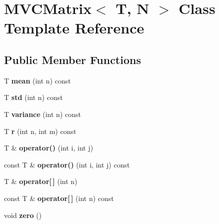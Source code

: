\hypertarget{classMVCMatrix}{}\section{M\+V\+C\+Matrix$<$ T, N $>$ Class Template Reference}
\label{classMVCMatrix}
\subsection*{Public Member Functions}
\begin{DoxyCompactItemize}
\item 
\mbox{\label{classMVCMatrix_a08f50c0e3b5565a94599fe1e9bfb473a}} 
T {\bfseries mean} (int n) const
\item 
\mbox{\label{classMVCMatrix_a57beba1da7fe709bbb9d0e8fd15759bf}} 
T {\bfseries std} (int n) const
\item 
\mbox{\label{classMVCMatrix_a16edd049740bd6aabcc380f17c48204a}} 
T {\bfseries variance} (int n) const
\item 
\mbox{\label{classMVCMatrix_a28dfce1aa8d04008ca50605332c2f2b0}} 
T {\bfseries r} (int n, int m) const
\item 
\mbox{\label{classMVCMatrix_a029ee737822faabdf046f956ca0776bd}} 
T \& {\bfseries operator()} (int i, int j)
\item 
\mbox{\label{classMVCMatrix_a57937186999075e8201e645a15302d05}} 
const T \& {\bfseries operator()} (int i, int j) const
\item 
\mbox{\label{classMVCMatrix_a609c0b7ba6a1e68cefece451488044b1}} 
T \& {\bfseries operator\mbox{[}$\,$\mbox{]}} (int n)
\item 
\mbox{\label{classMVCMatrix_acaf268d490eb9022271dd16d6b99fb72}} 
const T \& {\bfseries operator\mbox{[}$\,$\mbox{]}} (int n) const
\item 
\mbox{\label{classMVCMatrix_ae878724ee3bfb377f1606d2ec1935781}} 
void {\bfseries zero} ()
\item 

\end{DoxyCompactItemize}
